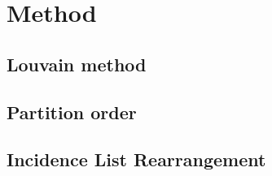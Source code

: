 \chapter{Method}\label{\positionnumber}
    \section{Louvain method}\label{\positionnumber}
    
    \section{Partition order}\label{\positionnumber}
    
    \section{Incidence List Rearrangement}\label{\positionnumber}
